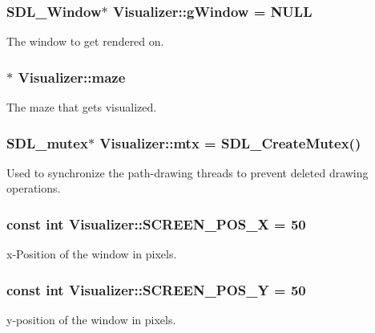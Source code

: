 \subsubsection[{\texorpdfstring{g\+Window}{gWindow}}]{\setlength{\rightskip}{0pt plus 5cm}S\+D\+L\+\_\+\+Window$\ast$ Visualizer\+::g\+Window = N\+U\+LL}\hypertarget{class_visualizer_a7bf9d248519e29ed8083706569c663c5}{}\label{class_visualizer_a7bf9d248519e29ed8083706569c663c5}
The window to get rendered on. 
\subsubsection[{\texorpdfstring{maze}{maze}}]{$\ast$ Visualizer\+::maze}\hypertarget{class_visualizer_a6a395e1836267177157554215304cb15}{}\label{class_visualizer_a6a395e1836267177157554215304cb15}
The maze that gets visualized. 
\subsubsection[{\texorpdfstring{mtx}{mtx}}]{\setlength{\rightskip}{0pt plus 5cm}S\+D\+L\+\_\+mutex$\ast$ Visualizer\+::mtx = S\+D\+L\+\_\+\+Create\+Mutex()}\hypertarget{class_visualizer_af3cda6322743e852a05cdc6677727752}{}\label{class_visualizer_af3cda6322743e852a05cdc6677727752}
Used to synchronize the path-\/drawing threads to prevent deleted drawing operations. 
\subsubsection[{\texorpdfstring{S\+C\+R\+E\+E\+N\+\_\+\+P\+O\+S\+\_\+X}{SCREEN_POS_X}}]{\setlength{\rightskip}{0pt plus 5cm}const int Visualizer\+::\+S\+C\+R\+E\+E\+N\+\_\+\+P\+O\+S\+\_\+X = 50}\hypertarget{class_visualizer_a5c699928671f8be884b1d7801c242490}{}\label{class_visualizer_a5c699928671f8be884b1d7801c242490}
x-\/\+Position of the window in pixels. 
\subsubsection[{\texorpdfstring{S\+C\+R\+E\+E\+N\+\_\+\+P\+O\+S\+\_\+Y}{SCREEN_POS_Y}}]{\setlength{\rightskip}{0pt plus 5cm}const int Visualizer\+::\+S\+C\+R\+E\+E\+N\+\_\+\+P\+O\+S\+\_\+Y = 50}\hypertarget{class_visualizer_a96ed3b95d01478071f5bfe091871488c}{}\label{class_visualizer_a96ed3b95d01478071f5bfe091871488c}
y-\/position of the window in pixels. 
